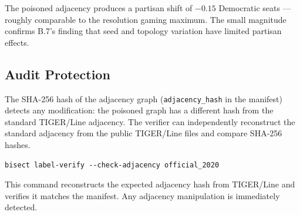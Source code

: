 The poisoned adjacency produces a partisan shift of $-0.15$ Democratic seats ---
roughly comparable to the resolution gaming maximum.
The small magnitude confirms B.7's finding that seed and topology variation
have limited partisan effects.

\subsection{Audit Protection}

The SHA-256 hash of the adjacency graph (\texttt{adjacency\_hash} in the manifest)
detects any modification: the poisoned graph has a different hash from the standard
TIGER/Line adjacency.
The verifier can independently reconstruct the standard adjacency from the public
TIGER/Line files and compare SHA-256 hashes.

\begin{verbatim}
bisect label-verify --check-adjacency official_2020
\end{verbatim}

This command reconstructs the expected adjacency hash from TIGER/Line and verifies
it matches the manifest. Any adjacency manipulation is immediately detected.
